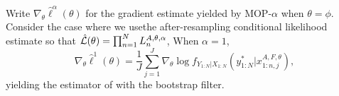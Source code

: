 



\begin{lem}
    \label{lem:mop-1-formula}
    Write $\nabla_\theta \hat\ell^\alpha(\theta)$ for the gradient estimate yielded by MOP-$\alpha$ when $\theta=\phi$. Consider the case where we usethe after-resampling conditional likelihood estimate so that $\hat{\mathcal{L}}(\theta) = \prod_{n=1}^N L_n^{A, \theta, \alpha}$, When $\alpha=1$,
    \begin{equation}
        \nabla_\theta \hat{\ell}^1(\theta) 
        = \frac{1}{J}\sum_{j=1}^J \nabla_\theta \log f_{Y_{1:N}|X_{1:N}}\left(y_{1:N}^* | x_{1:n,j}^{A, F,\theta}\right),
    \end{equation}
    yielding the estimator of \cite{poyiadjis11, scibior21} with the bootstrap filter.
\end{lem}

